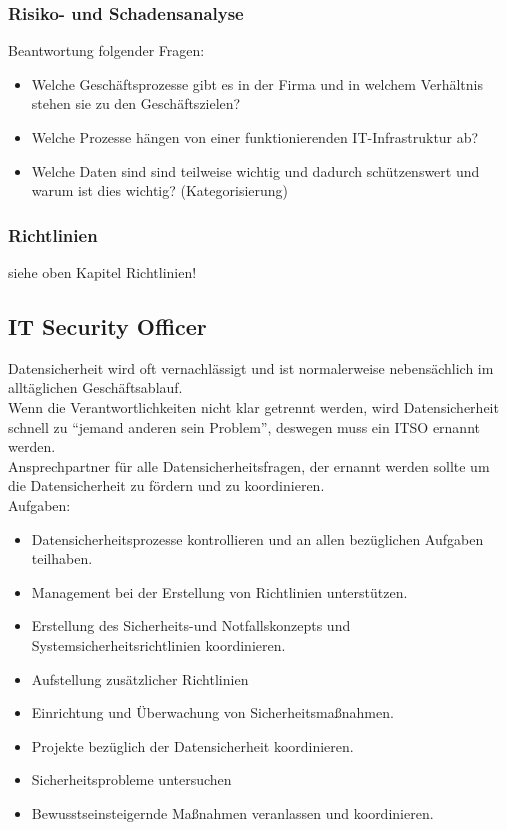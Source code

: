 \documentclass{article} %
\begin{document}
\subsubsection{Risiko- und Schadensanalyse}
Beantwortung folgender Fragen:
\begin{itemize}
	\item Welche Geschäftsprozesse gibt es in der Firma und in welchem Verhältnis stehen sie zu den Geschäftszielen?
    \item Welche Prozesse hängen von einer funktionierenden IT-Infrastruktur ab?
    \item Welche Daten sind sind teilweise wichtig und dadurch schützenswert und warum ist dies wichtig? (Kategorisierung)
\end{itemize}
\subsubsection{Richtlinien}
siehe oben Kapitel Richtlinien!
\subsection{IT Security Officer}
Datensicherheit wird oft vernachlässigt und ist normalerweise nebensächlich im alltäglichen Geschäftsablauf.\\
Wenn die Verantwortlichkeiten nicht klar getrennt werden, wird Datensicherheit schnell zu "`jemand anderen sein Problem"', deswegen muss ein ITSO ernannt werden.\\
Ansprechpartner für alle Datensicherheitsfragen, der ernannt werden sollte um die Datensicherheit zu fördern und zu koordinieren.\\
Aufgaben:
\begin{itemize}
	\item Datensicherheitsprozesse kontrollieren und an allen bezüglichen Aufgaben teilhaben.
    \item Management bei der Erstellung von Richtlinien unterstützen.
    \item Erstellung des Sicherheits-und Notfallskonzepts und Systemsicherheitsrichtlinien koordinieren.
    \item Aufstellung zusätzlicher Richtlinien
    \item Einrichtung und Überwachung von Sicherheitsmaßnahmen.
    \item Projekte bezüglich der Datensicherheit koordinieren.
    \item Sicherheitsprobleme untersuchen
    \item Bewusstseinsteigernde Maßnahmen veranlassen und koordinieren.
\end{itemize}
\end{document}
